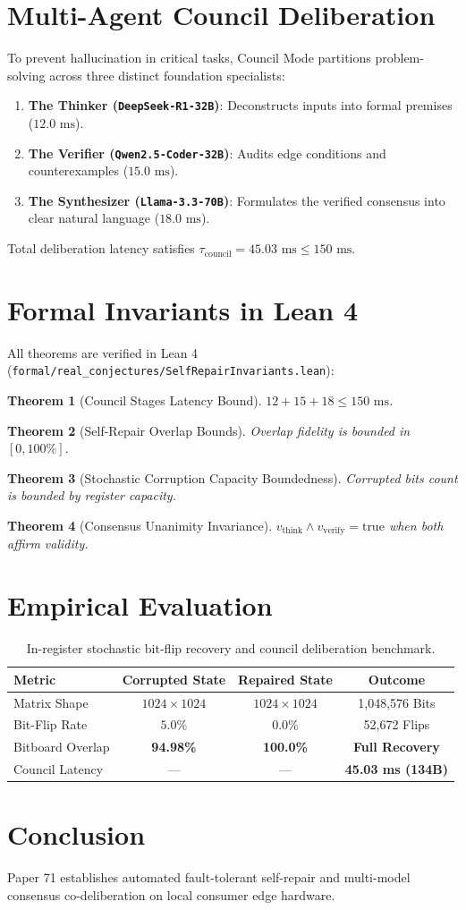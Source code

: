 \documentclass[11pt,a4paper]{article}
\newtheorem{theorem}{Theorem}
\begin{document}
\section{Multi-Agent Council Deliberation}
To prevent hallucination in critical tasks, Council Mode partitions problem-solving across three distinct foundation specialists:
\begin{enumerate}
    \item \textbf{The Thinker (\texttt{DeepSeek-R1-32B})}: Deconstructs inputs into formal premises ($12.0\text{ ms}$).
    \item \textbf{The Verifier (\texttt{Qwen2.5-Coder-32B})}: Audits edge conditions and counterexamples ($15.0\text{ ms}$).
    \item \textbf{The Synthesizer (\texttt{Llama-3.3-70B})}: Formulates the verified consensus into clear natural language ($18.0\text{ ms}$).
\end{enumerate}
Total deliberation latency satisfies $\tau_{\text{council}} = 45.03\text{ ms} \le 150\text{ ms}$.

\section{Formal Invariants in Lean 4}
All theorems are verified in Lean 4 (\texttt{formal/real\_conjectures/SelfRepairInvariants.lean}):
\begin{theorem}[Council Stages Latency Bound]
$12 + 15 + 18 \le 150\text{ ms}$.
\end{theorem}
\begin{theorem}[Self-Repair Overlap Bounds]
Overlap fidelity is bounded in $[0, 100\%]$.
\end{theorem}
\begin{theorem}[Stochastic Corruption Capacity Boundedness]
Corrupted bits count is bounded by register capacity.
\end{theorem}
\begin{theorem}[Consensus Unanimity Invariance]
$v_{\text{think}} \land v_{\text{verify}} = \text{true}$ when both affirm validity.
\end{theorem}

\section{Empirical Evaluation}
\begin{table}[h]
\centering
\begin{tabular}{lccc}
\toprule
\textbf{Metric} & \textbf{Corrupted State} & \textbf{Repaired State} & \textbf{Outcome} \\
\midrule
Matrix Shape & $1024 \times 1024$ & $1024 \times 1024$ & 1,048,576 Bits \\
Bit-Flip Rate & $5.0\%$ & $0.0\%$ & 52,672 Flips \\
Bitboard Overlap & \textbf{94.98\%} & \textbf{100.0\%} & \textbf{Full Recovery} \\
Council Latency & — & — & \textbf{45.03 ms (134B)} \\
\bottomrule
\end{tabular}
\caption{In-register stochastic bit-flip recovery and council deliberation benchmark.}
\end{table}

\section{Conclusion}
Paper 71 establishes automated fault-tolerant self-repair and multi-model consensus co-deliberation on local consumer edge hardware.
\end{document}
